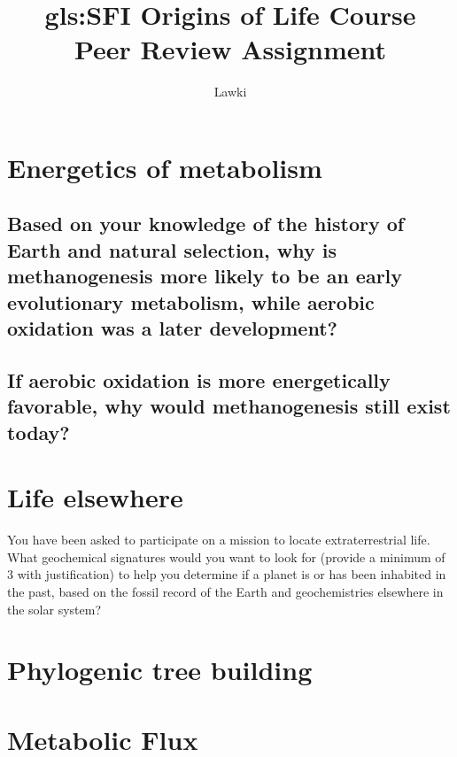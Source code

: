 \documentclass[]{article}
\title{
	\gls{gls:SFI} Origins of Life Course\\
	Peer Review Assignment}
\author{Lawki}
\begin{document}
\maketitle

\begin{abstract}

\end{abstract}

\section{Energetics of metabolism}

\subsection{
	Based on your knowledge of the history of Earth and natural selection, why is methanogenesis more likely to be an early evolutionary metabolism, while aerobic oxidation was a later development?
}

\subsection{
	If aerobic oxidation is more energetically favorable, why would methanogenesis still exist today?}

\section{Life elsewhere}

You have been asked to participate on a mission to locate extraterrestrial life. What geochemical signatures would you want to look for (provide a minimum of 3 with justification) to help you determine if a planet is or has been inhabited in the past, based on the fossil record of the Earth and geochemistries elsewhere in the solar system?

\section{Phylogenic tree building}

\section{Metabolic Flux}


\printglossaries




\end{document}
